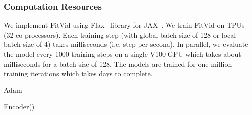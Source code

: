 \documentclass{article}
\newcommand{\model}{FitVid\xspace}
\begin{document}
\subsubsection{Computation Resources}
\label{app:resources}
We implement \model using Flax~\cite{flax2020github} library for JAX~\cite{jax2018github}. We train \model on  TPUs (32 co-processors). Each training step (with global batch size of 128 or local batch size of 4) takes  milliseconds (i.e.  step per second). In parallel, we evaluate the model every 1000 training steps on a single V100 GPU which takes about  milliseconds for a batch size of 128. 
The models are trained for one million training iterations which takes  days to complete. 

\newcommand\mycommfont[1]{\scriptsize\ttfamily\textcolor{blue}{#1}}

\begin{minipage}[t]{0.46\textwidth}
\begin{algorithm}[H]
\footnotesize
\SetAlgoLined
{}

    \hspace{0.1cm}
    
    
    Adam
 \caption{\model training.}
 \label{alg:train}
\end{algorithm}
\end{minipage}\hfill \begin{minipage}[t]{0.46\textwidth}
\begin{algorithm}[H]
\footnotesize
\SetAlgoLined
{}
\KwOutput{}
    \hspace{0.1cm}
    Encoder() 
 \caption{\model prediction.}
 \label{alg:eval}
\end{algorithm}
\end{minipage}
\end{document}
